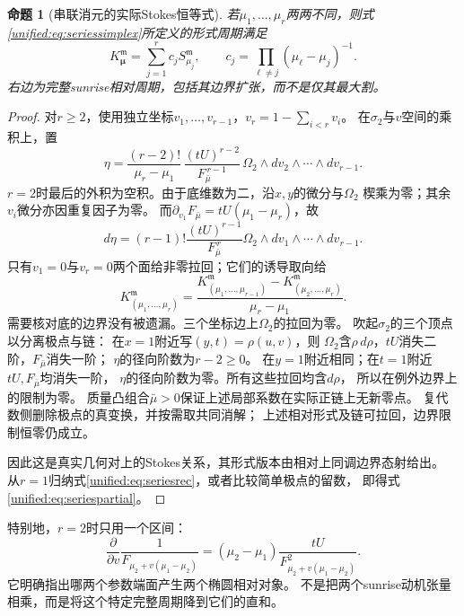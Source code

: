 \documentclass[11pt,a4paper,oneside]{ctexart}
\theoremstyle{cnplain}
\newtheorem{proposition}[theorem]{命题}
\theoremstyle{definition}
\theoremstyle{remark}
\numberwithin{equation}{section}
\begin{document}
\begin{proposition}[串联消元的实际Stokes恒等式]\label{unified:prop:seriesstokes}
若$\mu_1,\ldots,\mu_r$两两不同，则式\eqref{unified:eq:seriessimplex}所定义的形式周期满足
\begin{equation}\label{unified:eq:seriespartial}
 K_{\boldsymbol\mu}^{\mathfrak m}
 =\sum_{j=1}^r c_jS_{\mu_j}^{\mathfrak m},
 \qquad c_j=\prod_{\ell\ne j}(\mu_\ell-\mu_j)^{-1}.
\end{equation}
右边为完整sunrise相对周期，包括其边界扩张，而不是仅其最大割。
\end{proposition}
\begin{proof}
对$r\ge2$，使用独立坐标$v_1,\ldots,v_{r-1}$，$v_r=1-\sum_{i<r}v_i$。
在$\sigma_2$与$v$空间的乘积上，置
\[
 \eta=\frac{(r-2)!}{\mu_r-\mu_1}\,
 \frac{(tU)^{r-2}}{F_{\bar\mu}^{\,r-1}}\,
 \Omega_2\wedge dv_2\wedge\cdots\wedge dv_{r-1}.
\]
$r=2$时最后的外积为空积。由于底维数为二，沿$x,y$的微分与$\Omega_2$
楔乘为零；其余$v_i$微分亦因重复因子为零。
而$\partial_{v_1}F_{\bar\mu}=tU(\mu_1-\mu_r)$，故
\[
 d\eta=(r-1)!\frac{(tU)^{r-1}}{F_{\bar\mu}^{\,r}}
       \Omega_2\wedge dv_1\wedge\cdots\wedge dv_{r-1}.
\]
只有$v_1=0$与$v_r=0$两个面给非零拉回；它们的诱导取向给
\begin{equation}\label{unified:eq:seriesrec}
 K_{(\mu_1,\ldots,\mu_r)}^{\mathfrak m}
 =\frac{K_{(\mu_1,\ldots,\mu_{r-1})}^{\mathfrak m}
        -K_{(\mu_2,\ldots,\mu_r)}^{\mathfrak m}}
       {\mu_r-\mu_1}.
\end{equation}
需要核对底的边界没有被遗漏。三个坐标边上$\Omega_2$的拉回为零。
吹起$\sigma_2$的三个顶点以分离极点与链：
在$x=1$附近写$(y,t)=\rho(u,v)$，则
$\Omega_2$含$\rho\,d\rho$，$tU$消失二阶，$F_{\bar\mu}$消失一阶；
$\eta$的径向阶数为$r-2\ge0$。
在$y=1$附近相同；在$t=1$附近$tU,F_{\bar\mu}$均消失一阶，
$\eta$的径向阶数为零。所有这些拉回均含$d\rho$，
所以在例外边界上的限制为零。
质量凸组合$\bar\mu>0$保证上述局部系数在实际正链上无新零点。
复代数侧删除极点的真变换，并按需取共同消解；
上述相对形式及链可拉回，边界限制恒零仍成立。

因此这是真实几何对上的Stokes关系，其形式版本由相对上同调边界态射给出。
从$r=1$归纳式\eqref{unified:eq:seriesrec}，或者比较简单极点的留数，
即得式\eqref{unified:eq:seriespartial}。
\end{proof}

特别地，$r=2$时只用一个区间：
\[
 \frac{\partial}{\partial v}\frac1{F_{\mu_2+v(\mu_1-\mu_2)}}
 =(\mu_2-\mu_1)\frac{tU}{F_{\mu_2+v(\mu_1-\mu_2)}^2}.
\]
它明确指出哪两个参数端面产生两个椭圆相对对象。
不是把两个sunrise动机张量相乘，而是将这个特定完整周期降到它们的直和。
\end{document}
